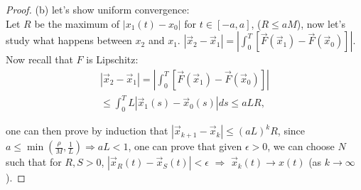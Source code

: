\begin{proof}
    \noindent (b) let's show uniform convergence: \\

    Let $R$ be the maximum of $|x_1(t)-x_0|$ for $t \in [-a,a]$, ($R \leq aM$), now let's study what happens between $x_2$ and $x_1$. $|\vec{x}_2 - \vec{x}_1| = |\int_0^T \left[ \vec{F}(\vec{x}_1) - \vec{F}(\vec{x}_0) \right]|$. \\ 

    Now recall that $F$ is Lipschitz:
    \begin{align*}
        |\vec{x}_2 - \vec{x}_1| = |\int_0^T \left[ \vec{F}(\vec{x}_1) - \vec{F}(\vec{x}_0) \right]|\\
        \leq \int_0^T L |\vec{x}_1(s) - \vec{x}_0(s)| ds \leq aLR,
    \end{align*}

    one can then prove by induction that $|\vec{x}_{k+1} - \vec{x}_k| \leq (aL)^k R$, since $a \leq \min \left( \frac{\rho}{M}, \frac{1}{L} \right) \Rightarrow aL < 1$, one can prove that given $\epsilon > 0$, we can choose $N$ such that for $R,S > 0$, $|\vec{x}_R(t) - \vec{x}_S(t)| < \epsilon$ $\Rightarrow$ $\vec{x}_k(t) \rightarrow x(t)$ (as $k \rightarrow \infty$).

\end{proof}